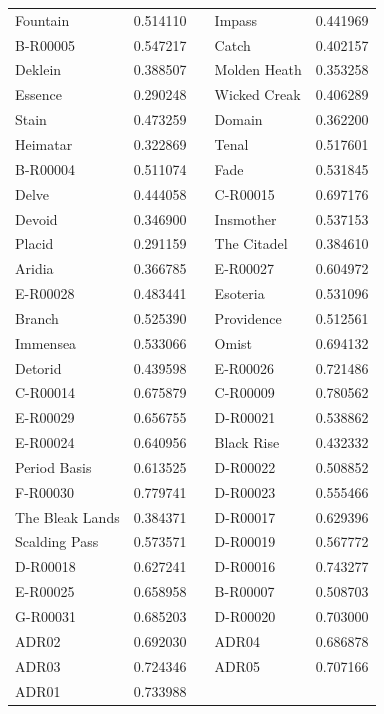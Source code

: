 \documentclass[letterpaper,12pt,article]{memoir}
\begin{document}
\begin{center}
\begin{longtable}{lllll}
    Fountain                & 0.514110 & & Impass           & 0.441969 \\
    B-R00005                & 0.547217 & & Catch            & 0.402157 \\
    Deklein                 & 0.388507 & & Molden Heath     & 0.353258 \\
    Essence                 & 0.290248 & & Wicked Creak     & 0.406289 \\
    Stain                   & 0.473259 & & Domain           & 0.362200 \\
    Heimatar                & 0.322869 & & Tenal            & 0.517601 \\
    B-R00004                & 0.511074 & & Fade             & 0.531845 \\
    Delve                   & 0.444058 & & C-R00015         & 0.697176 \\
    Devoid                  & 0.346900 & & Insmother        & 0.537153 \\
    Placid                  & 0.291159 & & The Citadel      & 0.384610 \\
    Aridia                  & 0.366785 & & E-R00027         & 0.604972 \\
    E-R00028                & 0.483441 & & Esoteria         & 0.531096 \\
    Branch                  & 0.525390 & & Providence       & 0.512561 \\
    Immensea                & 0.533066 & & Omist            & 0.694132 \\
    Detorid                 & 0.439598 & & E-R00026         & 0.721486 \\
    C-R00014                & 0.675879 & & C-R00009         & 0.780562 \\
    E-R00029                & 0.656755 & & D-R00021         & 0.538862 \\
    E-R00024                & 0.640956 & & Black Rise       & 0.432332 \\
    Period Basis            & 0.613525 & & D-R00022         & 0.508852 \\
    F-R00030                & 0.779741 & & D-R00023         & 0.555466 \\
    The Bleak Lands         & 0.384371 & & D-R00017         & 0.629396 \\
    Scalding Pass           & 0.573571 & & D-R00019         & 0.567772 \\
    D-R00018                & 0.627241 & & D-R00016         & 0.743277 \\
    E-R00025                & 0.658958 & & B-R00007         & 0.508703 \\
    G-R00031                & 0.685203 & & D-R00020         & 0.703000 \\
    ADR02                   & 0.692030 & & ADR04            & 0.686878 \\
    ADR03                   & 0.724346 & & ADR05            & 0.707166 \\
    ADR01                   & 0.733988 \\
\end{longtable}
\end{center}
\end{document}
